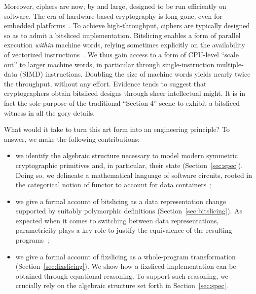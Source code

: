 \documentclass[draft,english]{jflart}
\begin{document}

Moreover, ciphers are now, by and large, designed to be run
efficiently on software. The era of hardware-based cryptography is
long gone, even for embedded
platforms~\citep{buchanan:nist-lightweight-crypto}. To achieve
high-throughput, ciphers are typically designed so as to admit a
bitsliced implementation. Bitslicing enables a form of parallel
execution \emph{within} machine words, relying sometimes explicitly on
the availability of vectorized instructions~\citep{beaulieu:speck,
  bernstein:chacha}. We thus gain access to a form of CPU-level
``scale out'' to larger machine words, in particular through
single-instruction multiple-data (SIMD) instructions. Doubling the
size of machine words yields nearly twice the throughput, without any
effort. Evidence tends to suggest that cryptographers obtain bitsliced
designs through sheer intellectual might. It is in fact the sole
purpose of the traditional ``Section 4'' scene to exhibit a bitsliced
witness in all the gory details.


What would it take to turn this art form into an engineering
principle? To answer, we make the following contributions:
%
\begin{itemize}
\item we identify the algebraic structure necessary to model modern
  symmetric cryptographic primitives and, in particular, their state
  (Section~\ref{sec:spec}). Doing so, we delineate a mathematical
  language of software circuits, rooted in the categorical notion of
  functor to account for data containers~;
\item we give a formal account of bitslicing as a data representation
  change supported by suitably polymorphic definitions
  (Section~\ref{sec:bitslicing}). As expected when it comes to
  switching between data representations, parametricity plays a key
  role to justify the equivalence of the resulting programs~;
\item we give a formal account of fixslicing as a whole-program
  transformation (Section~\ref{sec:fixslicing}). We show how a
  fixsliced implementation can be obtained through equational
  reasoning. To support such reasoning, we crucially rely on the
  algebraic structure set forth in Section~\ref{sec:spec}.
\end{itemize}
\end{document}

